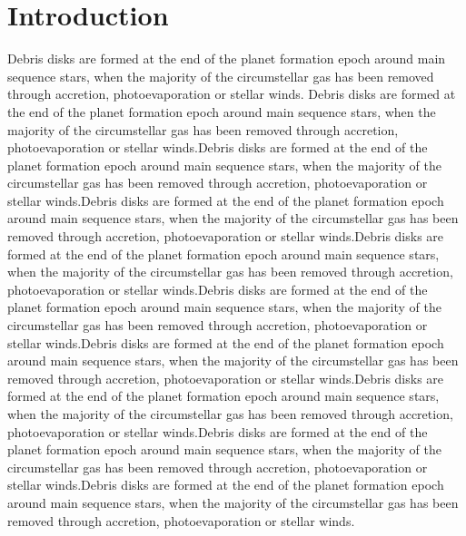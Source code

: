 \documentclass{aa}
\begin{document}
   \section{Introduction}

Debris disks are formed at the end of the planet formation epoch around main sequence stars, when the majority of the circumstellar gas has been removed through accretion, photoevaporation or stellar winds.
%
Debris disks are formed at the end of the planet formation epoch around main sequence stars, when the majority of the circumstellar gas has been removed through accretion, photoevaporation or stellar winds.Debris disks are formed at the end of the planet formation epoch around main sequence stars, when the majority of the circumstellar gas has been removed through accretion, photoevaporation or stellar winds.Debris disks are formed at the end of the planet formation epoch around main sequence stars, when the majority of the circumstellar gas has been removed through accretion, photoevaporation or stellar winds.Debris disks are formed at the end of the planet formation epoch around main sequence stars, when the majority of the circumstellar gas has been removed through accretion, photoevaporation or stellar winds.Debris disks are formed at the end of the planet formation epoch around main sequence stars, when the majority of the circumstellar gas has been removed through accretion, photoevaporation or stellar winds.Debris disks are formed at the end of the planet formation epoch around main sequence stars, when the majority of the circumstellar gas has been removed through accretion, photoevaporation or stellar winds.Debris disks are formed at the end of the planet formation epoch around main sequence stars, when the majority of the circumstellar gas has been removed through accretion, photoevaporation or stellar winds.Debris disks are formed at the end of the planet formation epoch around main sequence stars, when the majority of the circumstellar gas has been removed through accretion, photoevaporation or stellar winds.Debris disks are formed at the end of the planet formation epoch around main sequence stars, when the majority of the circumstellar gas has been removed through accretion, photoevaporation or stellar winds.

\end{document}
